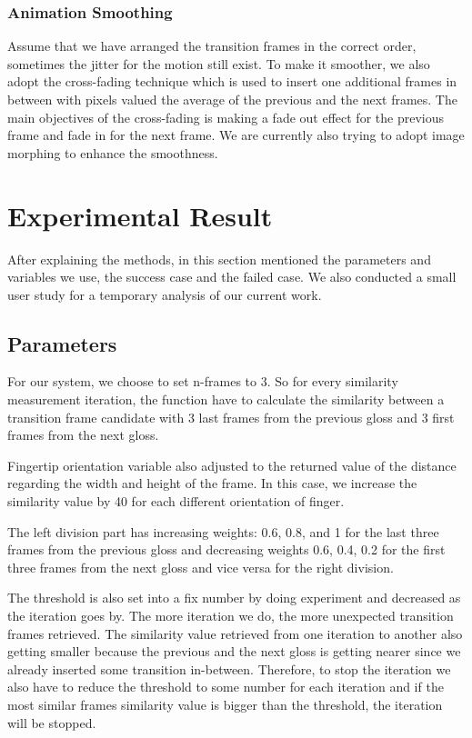\documentclass{sig-alternate-05-2015}
\begin{document}
\subsubsection{Animation Smoothing}
Assume that we have arranged the transition frames in the correct order, sometimes the jitter for the motion still exist. To make it smoother, we also adopt the cross-fading technique which is used to insert one additional frames in between with pixels valued the average of the previous and the next frames. The main objectives of the cross-fading is making a fade out effect for the previous frame and fade in for the next frame. We are currently also trying to adopt image morphing to enhance the smoothness.

\section{Experimental Result}
After explaining the methods, in this section mentioned the parameters and variables we use, the success case and the failed case. We also conducted a small user study for a temporary analysis of our current work.

\subsection{Parameters}
For our system, we choose to set n-frames to 3. So for every similarity measurement iteration, the function have to calculate the similarity between a transition frame candidate with 3 last frames from the previous gloss and 3 first frames from the next gloss.

Fingertip orientation variable also adjusted to the returned value of the distance regarding the width and height of the frame. In this case, we increase the similarity value by 40 for each different orientation of finger.

The left division part has increasing weights: 0.6, 0.8, and 1 for the last three frames from the previous gloss and decreasing weights 0.6, 0.4, 0.2 for the first three frames from the next gloss and vice versa for the right division.

The threshold is also set into a fix number by doing experiment and decreased as the iteration goes by. The more iteration we do, the more unexpected transition frames retrieved. The similarity value retrieved from one iteration to another also getting smaller because the previous and the next gloss is getting nearer since we already inserted some transition in-between. Therefore, to stop the iteration we also have to reduce the threshold to some number for each iteration and if the most similar frames similarity value is bigger than the threshold, the iteration will be stopped. 
\end{document}
